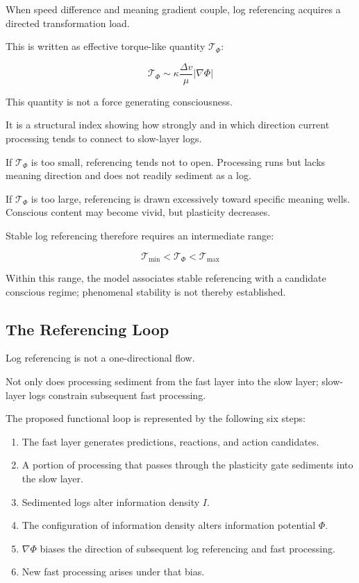 When speed difference and meaning gradient couple, log referencing acquires a directed transformation load.

This is written as effective torque-like quantity $\mathcal{T}_{\Phi}$:

\begin{equation}
\mathcal{T}_{\Phi} \sim \kappa \frac{\Delta v}{\mu} |\nabla \Phi|
\end{equation}

This quantity is not a force generating consciousness.

It is a structural index showing how strongly and in which direction current processing tends to connect to slow-layer logs.

If $\mathcal{T}_{\Phi}$ is too small, referencing tends not to open. Processing runs but lacks meaning direction and does not readily sediment as a log.

If $\mathcal{T}_{\Phi}$ is too large, referencing is drawn excessively toward specific meaning wells. Conscious content may become vivid, but plasticity decreases.

Stable log referencing therefore requires an intermediate range:

\begin{equation}
\mathcal{T}_{\min} < \mathcal{T}_{\Phi} < \mathcal{T}_{\max}
\end{equation}

Within this range, the model associates stable referencing with a candidate conscious regime; phenomenal stability is not thereby established.

\subsection{The Referencing Loop}


Log referencing is not a one-directional flow.

Not only does processing sediment from the fast layer into the slow layer; slow-layer logs constrain subsequent fast processing.

The proposed functional loop is represented by the following six steps:

\begin{enumerate}
\item The fast layer generates predictions, reactions, and action candidates.
\item A portion of processing that passes through the plasticity gate sediments into the slow layer.
\item Sedimented logs alter information density $I$.
\item The configuration of information density alters information potential $\Phi$.
\item $\nabla\Phi$ biases the direction of subsequent log referencing and fast processing.
\item New fast processing arises under that bias.
\end{enumerate}


